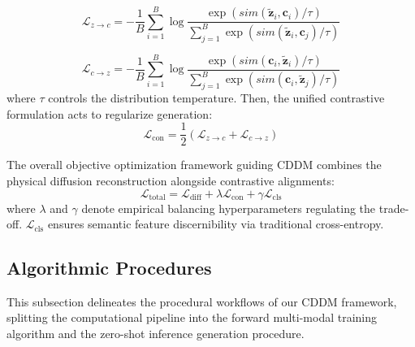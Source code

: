\begin{equation}\label{eq:contrastive_align_z}
\mathcal{L}_{z \rightarrow c} = - \frac{1}{B} \sum_{i=1}^B \log \frac{\exp\left(sim(\tilde{\mathbf{z}}_i, \mathbf{c}_i) / \tau\right)}{\sum_{j=1}^B \exp\left(sim(\tilde{\mathbf{z}}_i, \mathbf{c}_j) / \tau\right)}
\end{equation}

\begin{equation}\label{eq:contrastive_align_c}
\mathcal{L}_{c \rightarrow z} = - \frac{1}{B} \sum_{i=1}^B \log \frac{\exp\left(sim(\mathbf{c}_i, \tilde{\mathbf{z}}_i) / \tau\right)}{\sum_{j=1}^B \exp\left(sim(\mathbf{c}_i, \tilde{\mathbf{z}}_j) / \tau\right)}
\end{equation}
where $\tau$ controls the distribution temperature. Then, the unified contrastive formulation acts to regularize generation:
\begin{equation}\label{eq:contrastive_total}
\mathcal{L}_{\text{con}} = \frac{1}{2} (\mathcal{L}_{z \rightarrow c} + \mathcal{L}_{c \rightarrow z})
\end{equation}

The overall objective optimization framework guiding CDDM combines the physical diffusion reconstruction alongside contrastive alignments:
\begin{equation}\label{eq:total_objective}
\mathcal{L}_{\text{total}} = \mathcal{L}_{\text{diff}} + \lambda \mathcal{L}_{\text{con}} + \gamma \mathcal{L}_{\text{cls}}
\end{equation}
where $\lambda$ and $\gamma$ denote empirical balancing hyperparameters regulating the trade-off. $\mathcal{L}_{\text{cls}}$ ensures semantic feature discernibility via traditional cross-entropy.

\subsection{Algorithmic Procedures}
\label{subsec:algorithm}

This subsection delineates the procedural workflows of our CDDM framework, splitting the computational pipeline into the forward multi-modal training algorithm and the zero-shot inference generation procedure.

